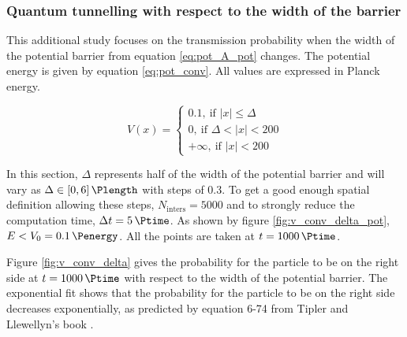 \documentclass[a4paper,12pt,twoside]{article}
\begin{document}
      \subsubsection{Quantum tunnelling with respect to the width of the barrier}
        This additional study focuses on the transmission probability when the width of the potential barrier from equation \eqref{eq:pot_A_pot} changes.
        The potential energy is given by equation \eqref{eq:pot_conv}.
        All values are expressed in Planck energy.

        \begin{equation}
          V(x) =
          \begin{cases}
            0.1,~\text{if $|x| \leq \Delta$}\\
            0,~\text{if $\Delta < |x| < 200$}\\
            +\infty,~\text{if $|x| < 200$}
          \end{cases}
          \label{eq:pot_conv}
        \end{equation}

        In this section, $\Delta$ represents half of the width of the potential barrier and will vary as $\Delta \in \left[0, 6\right] \si{\Plength}$ with steps of \SI{0.3}{\Plength}.
        To get a good enough spatial definition allowing these steps, $N_\text{inters} = \num{5000}$ and to strongly reduce the computation time, $\Delta t = \SI{5}{\Ptime}$.
        As shown by figure \ref{fig:v_conv_delta_pot}, $E<V_0=\SI{0.1}{\Penergy}$.
        All the points are taken at $t = \SI{1000}{\Ptime}$.

        Figure \ref{fig:v_conv_delta} gives the probability for the particle to be on the right side at $t = \SI{1000}{\Ptime}$ with respect to the width of the potential barrier.
        The exponential fit shows that the probability for the particle to be on the right side decreases exponentially, as predicted by equation 6-74 from Tipler and Llewellyn's book \cite{tipler-llewellyn}.
\end{document}
